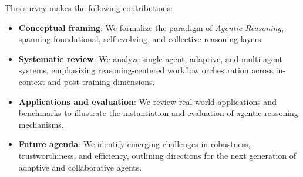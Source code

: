 \begin{tcolorbox}[agentcontrib]
This survey makes the following contributions:
\begin{itemize}
\item \textbf{Conceptual framing}: We formalize the paradigm of \emph{Agentic Reasoning}, spanning foundational, self-evolving, and collective reasoning layers.
\item \textbf{Systematic review}: We analyze single-agent, adaptive, and multi-agent systems, emphasizing reasoning-centered workflow orchestration across in-context and post-training dimensions.


\item \textbf{Applications and evaluation}: We review real-world applications and benchmarks to illustrate the instantiation and evaluation of agentic reasoning mechanisms.
\item \textbf{Future agenda}: We identify emerging challenges in robustness, trustworthiness, and efficiency, outlining directions for the next generation of adaptive and collaborative agents.
\end{itemize}
\end{tcolorbox}

